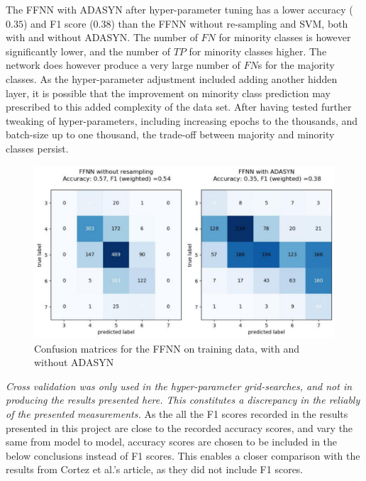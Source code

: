 \documentclass[%
oneside,                 %
final,                   %
10pt]{article}
\begin{document}
The FFNN with ADASYN after hyper-parameter tuning has a lower accuracy ($0.35$) and F1 score ($0.38$) than the FFNN without re-sampling and SVM, both with and without ADASYN. The number of $FN$ for minority classes is however significantly lower, and the number of $TP$ for minority classes higher. The network does however produce a very large number of 
$FN$s for the majority classes. As the hyper-parameter adjustment included adding another hidden layer, it is possible that the improvement on minority class prediction may prescribed to this added complexity of the data set. After having tested further tweaking of hyper-parameters, including increasing epochs to the thousands, and batch-size up to one thousand, the trade-off between majority and minority classes persist. 



\begin{figure}[!h]
        \centering 
         \includegraphics[scale=0.5]{../Results/confusions_NN.pdf} 
          \caption{Confusion matrices for the FFNN on training data, with and without ADASYN}
        \label{fig:conf_NN}   
\end{figure}  
\textit{Cross validation was only used in the hyper-parameter grid-searches, and not in producing the results presented here. This constitutes a discrepancy in the reliably of the presented measurements.}
As the all the F1 scores recorded in the results presented in this project are close to the recorded accuracy scores, and vary the same from model to model, accuracy scores are chosen to be included in the below conclusions instead of F1 scores. This enables a closer comparison with the results from Cortez et al.'s article, as they did not include F1 scores.
\end{document}

